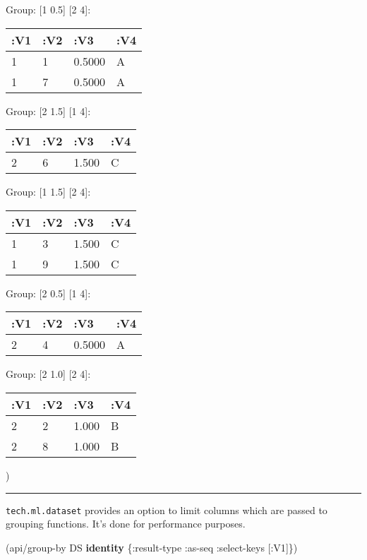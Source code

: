 \documentclass[]{article}
\newenvironment{Shaded}{\begin{snugshade}}{\end{snugshade}}
\newcommand{\KeywordTok}[1]{\textcolor[rgb]{0.13,0.29,0.53}{\textbf{#1}}}
\newcommand{\AttributeTok}[1]{\textcolor[rgb]{0.77,0.63,0.00}{#1}}
\newcommand{\NormalTok}[1]{#1}
\begin{document}
Group: {[}1 0.5{]} {[}2 4{]}:

\begin{longtable}[]{@{}llll@{}}
\toprule
:V1 & :V2 & :V3 & :V4\tabularnewline
\midrule
\endhead
1 & 1 & 0.5000 & A\tabularnewline
1 & 7 & 0.5000 & A\tabularnewline
\bottomrule
\end{longtable}

Group: {[}2 1.5{]} {[}1 4{]}:

\begin{longtable}[]{@{}llll@{}}
\toprule
:V1 & :V2 & :V3 & :V4\tabularnewline
\midrule
\endhead
2 & 6 & 1.500 & C\tabularnewline
\bottomrule
\end{longtable}

Group: {[}1 1.5{]} {[}2 4{]}:

\begin{longtable}[]{@{}llll@{}}
\toprule
:V1 & :V2 & :V3 & :V4\tabularnewline
\midrule
\endhead
1 & 3 & 1.500 & C\tabularnewline
1 & 9 & 1.500 & C\tabularnewline
\bottomrule
\end{longtable}

Group: {[}2 0.5{]} {[}1 4{]}:

\begin{longtable}[]{@{}llll@{}}
\toprule
:V1 & :V2 & :V3 & :V4\tabularnewline
\midrule
\endhead
2 & 4 & 0.5000 & A\tabularnewline
\bottomrule
\end{longtable}

Group: {[}2 1.0{]} {[}2 4{]}:

\begin{longtable}[]{@{}llll@{}}
\toprule
:V1 & :V2 & :V3 & :V4\tabularnewline
\midrule
\endhead
2 & 2 & 1.000 & B\tabularnewline
2 & 8 & 1.000 & B\tabularnewline
\bottomrule
\end{longtable}

)

\begin{center}\rule{0.5\linewidth}{0.5pt}\end{center}

\texttt{tech.ml.dataset} provides an option to limit columns which are
passed to grouping functions. It's done for performance purposes.

\begin{Shaded}
\begin{Highlighting}[]
\NormalTok{(api/group-by DS }\KeywordTok{identity}\NormalTok{ \{}\AttributeTok{:result-type} \AttributeTok{:as-seq}
                           \AttributeTok{:select-keys}\NormalTok{ [}\AttributeTok{:V1}\NormalTok{]\})}
\end{Highlighting}
\end{Shaded}
\end{document}
